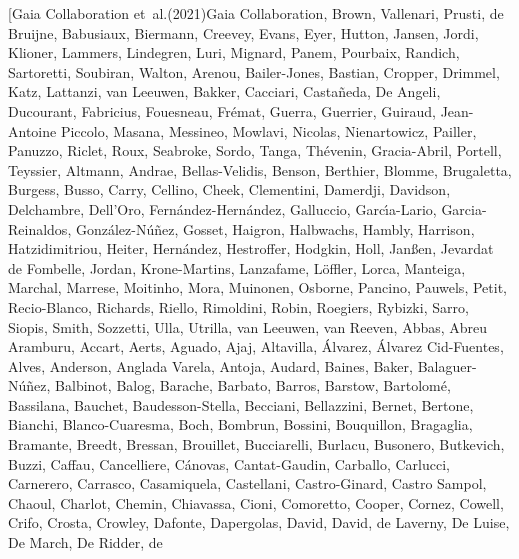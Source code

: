 \documentclass[longauth]{aa} %
\begin{document}
\begin{thebibliography}{112}
	\bibitem[{{Gaia Collaboration} {et~al.}(2021){Gaia Collaboration}, {Brown},
		{Vallenari}, {Prusti}, {de Bruijne}, {Babusiaux}, {Biermann}, {Creevey},
		{Evans}, {Eyer}, {Hutton}, {Jansen}, {Jordi}, {Klioner}, {Lammers},
		{Lindegren}, {Luri}, {Mignard}, {Panem}, {Pourbaix}, {Randich}, {Sartoretti},
		{Soubiran}, {Walton}, {Arenou}, {Bailer-Jones}, {Bastian}, {Cropper},
		{Drimmel}, {Katz}, {Lattanzi}, {van Leeuwen}, {Bakker}, {Cacciari},
		{Casta{\~n}eda}, {De Angeli}, {Ducourant}, {Fabricius}, {Fouesneau},
		{Fr{\'e}mat}, {Guerra}, {Guerrier}, {Guiraud}, {Jean-Antoine Piccolo},
		{Masana}, {Messineo}, {Mowlavi}, {Nicolas}, {Nienartowicz}, {Pailler},
		{Panuzzo}, {Riclet}, {Roux}, {Seabroke}, {Sordo}, {Tanga}, {Th{\'e}venin},
		{Gracia-Abril}, {Portell}, {Teyssier}, {Altmann}, {Andrae}, {Bellas-Velidis},
		{Benson}, {Berthier}, {Blomme}, {Brugaletta}, {Burgess}, {Busso}, {Carry},
		{Cellino}, {Cheek}, {Clementini}, {Damerdji}, {Davidson}, {Delchambre},
		{Dell'Oro}, {Fern{\'a}ndez-Hern{\'a}ndez}, {Galluccio}, {Garc{\'\i}a-Lario},
		{Garcia-Reinaldos}, {Gonz{\'a}lez-N{\'u}{\~n}ez}, {Gosset}, {Haigron},
		{Halbwachs}, {Hambly}, {Harrison}, {Hatzidimitriou}, {Heiter},
		{Hern{\'a}ndez}, {Hestroffer}, {Hodgkin}, {Holl}, {Jan{\ss}en}, {Jevardat de
			Fombelle}, {Jordan}, {Krone-Martins}, {Lanzafame}, {L{\"o}ffler}, {Lorca},
		{Manteiga}, {Marchal}, {Marrese}, {Moitinho}, {Mora}, {Muinonen}, {Osborne},
		{Pancino}, {Pauwels}, {Petit}, {Recio-Blanco}, {Richards}, {Riello},
		{Rimoldini}, {Robin}, {Roegiers}, {Rybizki}, {Sarro}, {Siopis}, {Smith},
		{Sozzetti}, {Ulla}, {Utrilla}, {van Leeuwen}, {van Reeven}, {Abbas}, {Abreu
			Aramburu}, {Accart}, {Aerts}, {Aguado}, {Ajaj}, {Altavilla}, {{\'A}lvarez},
		{{\'A}lvarez Cid-Fuentes}, {Alves}, {Anderson}, {Anglada Varela}, {Antoja},
		{Audard}, {Baines}, {Baker}, {Balaguer-N{\'u}{\~n}ez}, {Balbinot}, {Balog},
		{Barache}, {Barbato}, {Barros}, {Barstow}, {Bartolom{\'e}}, {Bassilana},
		{Bauchet}, {Baudesson-Stella}, {Becciani}, {Bellazzini}, {Bernet}, {Bertone},
		{Bianchi}, {Blanco-Cuaresma}, {Boch}, {Bombrun}, {Bossini}, {Bouquillon},
		{Bragaglia}, {Bramante}, {Breedt}, {Bressan}, {Brouillet}, {Bucciarelli},
		{Burlacu}, {Busonero}, {Butkevich}, {Buzzi}, {Caffau}, {Cancelliere},
		{C{\'a}novas}, {Cantat-Gaudin}, {Carballo}, {Carlucci}, {Carnerero},
		{Carrasco}, {Casamiquela}, {Castellani}, {Castro-Ginard}, {Castro Sampol},
		{Chaoul}, {Charlot}, {Chemin}, {Chiavassa}, {Cioni}, {Comoretto}, {Cooper},
		{Cornez}, {Cowell}, {Crifo}, {Crosta}, {Crowley}, {Dafonte}, {Dapergolas},
		{David}, {David}, {de Laverny}, {De Luise}, {De March}, {De Ridder}, {de
}}
\end{thebibliography}
\end{document}
